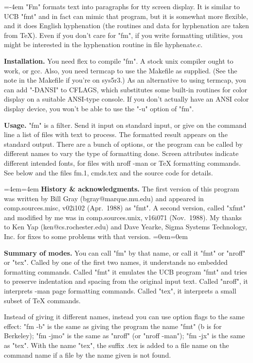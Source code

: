 \raggedright\parskip=12pt\parindent=-4em
"Fm" formats text into paragraphs for tty screen
display.  It is similar to UCB "fmt" and in fact can
mimic that program, but it is somewhat more flexible,
and it does English hyphenation (the routines and
data for hyphenation are taken from TeX).  Even if
you don't care for "fm", if you write formatting
utilities, you might be interested in the hyphenation
routine in file hyphenate.c.

{\bf Installation.}  You need flex to compile "fm".  A
stock unix compiler ought to work, or gcc.  Also,
you need termcap to use the Makefile as supplied.
(See the note in the Makefile if you're on sys5r3.)
As an alternative to using termcap, you can add
"-DANSI" to CFLAGS, which substitutes some built-in
routines for color display on a suitable ANSI-type
console.  If you don't actually have an ANSI color
display device, you won't be able to use the "-u"
option of "fm".

{\bf Usage.}  "fm" is a filter.  Send it input on standard input,
or give on the command line a list of files with text to process.  The
formatted result appears on the standard output.  There
are a bunch of options, or the program can be called
by different names to vary the type of formatting done.
Screen attributes indicate different intended fonts, for
files with nroff -man or TeX formatting commands.
See below and the files fm.1, cmds.tex and the source
code for details.

\leftskip=4em\rightskip=4em
{\bf History \& acknowledgments.}  The first version of this
program was written by Bill Gray (bgray@marque.mu.edu) and
appeared in comp.sources.misc, v02i102 (Apr.~1988) as
"fmt".  A second version, called "xfmt" and modified by me was in
comp.sources.unix, v16i071 (Nov.~1988).  My thanks to Ken Yap
(ken@cs.rochester.edu) and Dave Yearke, Sigma Systems Technology, Inc.
for fixes to some problems with that version.
\leftskip=0em\rightskip=0em

{\bf Summary of modes.}  You can call "fm" by that name, or call it
"fmt" or "nroff" or "tex".  Called by one of the first two
names, it understands no embedded formatting commands.  Called
"fmt" it emulates the UCB program "fmt" and tries to preserve
indentation and spacing from the original input text.  Called
"nroff", it interprets -man page formatting commands.  Called
"tex", it interprets a small subset of TeX commands.

\noindent Instead of giving it different names, instead you can
use option flags to the same effect: "fm -b" is the same as giving
the program the name "fmt" (b is for Berkeley); "fm -jmo" is the
same as "nroff" (or "nroff -man"); "fm -jx" is the same as "tex".
With the name "tex", the suffix .tex is added to a file name
on the command name if a file by the name given is not found.

